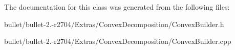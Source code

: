 The documentation for this class was generated from the following files\+:\begin{DoxyCompactItemize}
\item 
bullet/bullet-\/2.-\/r2704/\+Extras/\+Convex\+Decomposition/Convex\+Builder.\+h\item 
bullet/bullet-\/2.-\/r2704/\+Extras/\+Convex\+Decomposition/Convex\+Builder.\+cpp\end{DoxyCompactItemize}
